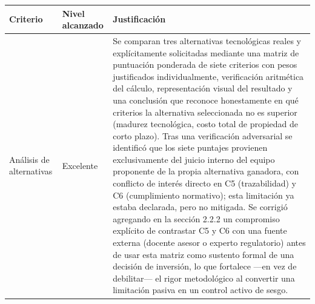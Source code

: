 \documentclass[11pt,a4paper]{article}
\begin{document}
{\small
\begin{longtable}[]{@{}
  >{\raggedright\arraybackslash}p{}
  >{\raggedright\arraybackslash}p{}
  >{\raggedright\arraybackslash}p{}@{}}
\toprule\noalign{}
\begin{minipage}[b]{\linewidth}\raggedright
Criterio
\end{minipage} & \begin{minipage}[b]{\linewidth}\raggedright
Nivel alcanzado
\end{minipage} & \begin{minipage}[b]{\linewidth}\raggedright
Justificación
\end{minipage} \\
\midrule\noalign{}
\endhead
\bottomrule\noalign{}
\endlastfoot
Análisis de alternativas & Excelente & Se comparan tres alternativas tecnológicas reales y explícitamente solicitadas mediante una matriz de puntuación ponderada de siete criterios con pesos justificados individualmente, verificación aritmética del cálculo, representación visual del resultado y una conclusión que reconoce honestamente en qué criterios la alternativa seleccionada no es superior (madurez tecnológica, costo total de propiedad de corto plazo). Tras una verificación adversarial se identificó que los siete puntajes provienen exclusivamente del juicio interno del equipo proponente de la propia alternativa ganadora, con conflicto de interés directo en C5 (trazabilidad) y C6 (cumplimiento normativo); esta limitación ya estaba declarada, pero no mitigada. Se corrigió agregando en la sección 2.2.2 un compromiso explícito de contrastar C5 y C6 con una fuente externa (docente asesor o experto regulatorio) antes de usar esta matriz como sustento formal de una decisión de inversión, lo que fortalece ---en vez de debilitar--- el rigor metodológico al convertir una limitación pasiva en un control activo de sesgo. \\

\end{longtable}}
\end{document}
